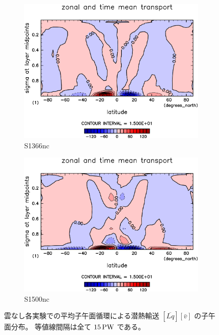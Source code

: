 \documentclass[body]{subfiles}
\begin{document}
\begin{figure}[t]
	\centering
	\begin{subfigure}{.4\textwidth}
		\centering
		\includegraphics[width=\textwidth]{S1366-nc/MeriHeatTransTest@latentEn_M,time=3650:4015-crop-rotate.pdf}
		\caption{S1366nc}\label{潜熱平均子午面循環S1366nc}
	\end{subfigure}
	\begin{subfigure}{.4\textwidth}
		\centering
		\includegraphics[width=\textwidth]{S1500-nc/MeriHeatTransTest@latentEn_M,time=3650:4015-crop-rotate.pdf}
		\caption{S1500nc}\label{潜熱平均子午面循環S1500nc}
	\end{subfigure}
	\caption[雲なし各実験での平均子午面循環による潜熱輸送の子午面分布]{
		雲なし各実験での平均子午面循環による潜熱輸送 \([\overline{Lq}][\bar v]\) の子午面分布。
		等値線間隔は全て \(15\hmu{PW}\) である。
	}\label{潜熱平均子午面循環nc}
\end{figure}
\end{document}
